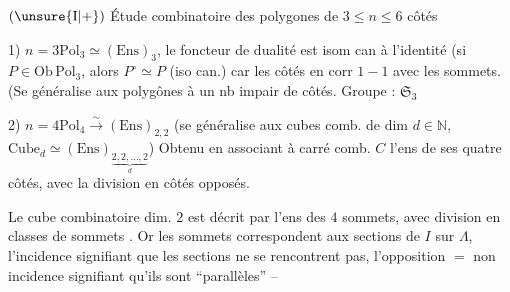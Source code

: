 


$(\unsure{\mathrm I|+})$ Étude combinatoire des polygones de $3\le n\le6$ côtés


1) \uline{$n=3$}\quad $\mathrm{Pol}_3\simeq(\mathrm{Ens})_3$, le foncteur de dualité est isom can à l'identité (si $P\in\mathrm{Ob}\,\mathrm{Pol}_3$, alors $P^\circ\simeq P$ (iso can.) car les côtés en corr $1-1$ avec les sommets. (Se généralise aux polygônes à un nb impair de côtés. Groupe : $\mathfrak S_{3}$

2) \uline{$n=4$}\quad $\mathrm{Pol}_4\xrightarrow{\sim}(\mathrm{Ens})_{2,2}$ (se généralise aux cubes comb. de dim $d\in\mathbb N$, $\mathrm{Cube}_d\simeq(\mathrm{Ens})_{\underbrace{2,2,\ldots,2}_{d}}$) Obtenu en associant à  carré comb. $C$ l'ens de ses quatre côtés, avec la division en côtés opposés.

Le cube combinatoire dim. $2$ est décrit par l'ens des $4$ sommets, avec division en classes de sommets . Or les sommets correspondent aux sections de $I$ sur $\Lambda$, l'incidence signifiant que les  sections ne se rencontrent pas, l'opposition $=$ non incidence signifiant qu'ils sont ``parallèles'' --

